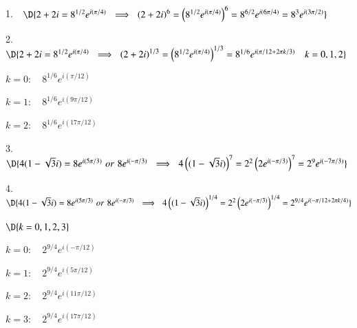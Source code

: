 \documentclass[11pt]{article}
\begin{document}



\vspace{0.2cm}

1. \,\, $\D{2+2i = 8^{1/2}e^{i(\pi/4)} \,\, \implies \,\, \left(2+2i\right)^6 = \left(8^{1/2}e^{i(\pi/4)}\right)^6 = 8^{6/2}e^{i(6\pi/4)} = 8^{3}e^{i(3\pi/2)}}$

\vspace{0.2cm}

2. \,\, $\D{2+2i = 8^{1/2}e^{i(\pi/4)} \,\, \implies \,\, \left(2+2i\right)^{1/3} = \left(8^{1/2}e^{i(\pi/4)}\right)^{1/3} = 8^{1/6}e^{i(\pi/12+2\pi k/3)} \quad k=0,1,2}$

\vspace{0.1cm}

\hspace{1.0cm} $k=0: \quad 8^{1/6}e^{i(\pi/12)}$

\hspace{1.0cm} $k=1: \quad 8^{1/6}e^{i(9\pi/12)}$

\hspace{1.0cm} $k=2: \quad 8^{1/6}e^{i(17\pi/12)}$

\vspace{0.2cm}

3. \,\, $\D{4(1-\sqrt{3}i) = 8e^{i(5\pi/3)} \,\, or \,\, 8e^{i(-\pi/3)} \,\, \implies \,\, 4\left((1-\sqrt{3}i)\right)^7 = 2^2\left(2e^{i(-\pi/3)}\right)^7 = 2^{9}e^{i(-7\pi/3)}}$

\vspace{0.2cm}

4. \,\, $\D{4(1-\sqrt{3}i) = 8e^{i(5\pi/3)} \,\, or \,\, 8e^{i(-\pi/3)} \,\, \implies \,\, 4\left((1-\sqrt{3}i)\right)^{1/4} = 2^2\left(2e^{i(-\pi/3)}\right)^{1/4} = 2^{9/4}e^{i(-\pi/12+2\pi k/4)}}$ 

\hspace{15.5cm} $\D{k=0,1,2,3}$

\hspace{1.0cm} $k=0: \quad 2^{9/4}e^{i(-\pi/12)}$

\hspace{1.0cm} $k=1: \quad 2^{9/4}e^{i(5\pi/12)}$

\hspace{1.0cm} $k=2: \quad 2^{9/4}e^{i(11\pi/12)}$

\hspace{1.0cm} $k=3: \quad 2^{9/4}e^{i(17\pi/12)}$

\vspace{0.2cm}
\end{document}
